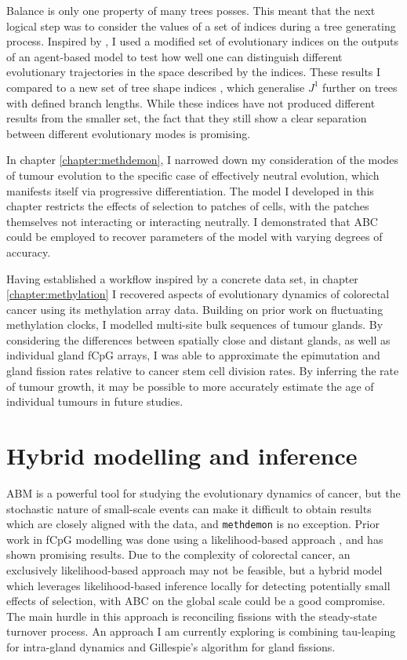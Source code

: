 Balance is only one property of many trees posses. This meant that the next
logical step was to consider the values of a set of indices during a tree
generating process. Inspired by \cite{noble_spatial_2022}, I used a modified set
of evolutionary indices on the outputs of an agent-based model to test how well
one can distinguish different evolutionary trajectories in the space described
by the indices. These results I compared to a new set of tree shape indices
\cite{noble_new_2023}, which generalise $J^1$ further on trees with defined
branch lengths. While these indices have not produced different results from the
smaller set, the fact that they still show a clear separation between different
evolutionary modes is promising. \par

In chapter \ref{chapter:methdemon}, I narrowed down my consideration of the
modes of tumour evolution to the specific case of effectively neutral evolution,
which manifests itself via progressive differentiation. The model I developed in
this chapter restricts the effects of selection to patches of cells, with the
patches themselves not interacting or interacting neutrally. I demonstrated that
ABC could be employed to recover parameters of the model with varying degrees of
accuracy. \par

Having established a workflow inspired by a concrete data set, in chapter
\ref{chapter:methylation} I recovered aspects of evolutionary dynamics of
colorectal cancer using its methylation array data. Building on prior work on
fluctuating methylation clocks, I modelled multi-site bulk sequences of tumour
glands. By considering the differences between spatially close and distant
glands, as well as individual gland fCpG arrays, I was able to approximate the
epimutation and gland fission rates relative to cancer stem cell division rates.
By inferring the rate of tumour growth, it may be possible to more accurately
estimate the age of individual tumours in future studies.

\section{Hybrid modelling and inference}
ABM is a powerful tool for studying the evolutionary dynamics of cancer, but the
stochastic nature of small-scale events can make it difficult to obtain results
which are closely aligned with the data, and \texttt{methdemon} is no exception.
Prior work in fCpG modelling was done using a likelihood-based approach
\cite{gabbutt_fluctuating_2022, gabbutt_evolutionary_2023}, and has shown
promising results. Due to the complexity of colorectal cancer, an exclusively
likelihood-based approach may not be feasible, but a hybrid model which
leverages likelihood-based inference locally for detecting potentially small
effects of selection, with ABC on the global scale could be a good compromise.
The main hurdle in this approach is reconciling fissions with the steady-state
turnover process. An approach I am currently exploring is combining tau-leaping
for intra-gland dynamics and Gillespie's algorithm for gland fissions.

